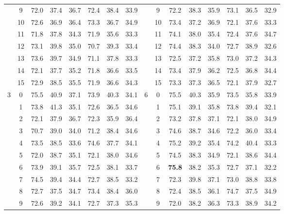 \begin{table}[p]
{\begin{tabular}{c c | c c c | c c c || c c | c c c | c c c}
             & 9 & 72.0 & 37.4 & 36.7 & 72.4 & 38.4 & 33.9 &  & 9 & 72.2 & 38.3 & 35.9 & 73.1 & 36.5 & 32.9 \\
             & 10 & 72.6 & 36.9 & 36.4 & 73.3 & 36.7 & 34.9 &  & 10 & 73.4 & 37.2 & 36.9 & 72.1 & 37.6 & 33.3 \\
             & 11 & 71.8 & 37.8 & 34.3 & 71.9 & 35.6 & 33.3 &  & 11 & 74.1 & 38.0 & 35.4 & 72.4 & 37.6 & 34.7 \\
             & 12 & 73.1 & 39.8 & 35.0 & 70.7 & 39.3 & 33.4 &  & 12 & 74.4 & 38.3 & 34.0 & 72.7 & 38.9 & 32.6 \\
             & 13 & 73.6 & 39.7 & 34.9 & 71.1 & 37.8 & 33.3 &  & 13 & 72.5 & 37.2 & 35.8 & 73.0 & 37.2 & 34.3 \\
             & 14 & 72.1 & 37.7 & 35.2 & 71.8 & 36.6 & 33.5 &  & 14 & 73.4 & 37.9 & 36.2 & 72.5 & 36.8 & 34.4 \\
             & 15 & 72.9 & 38.5 & 35.5 & 71.9 & 36.6 & 34.3 &  & 15 & 73.3 & 37.3 & 36.5 & 72.1 & 37.9 & 32.7 \\
            \midrule
            \multirow{16}{*}{3} & 0 & 75.5 & 40.9 & 37.1 & 73.9 & 40.3 & 34.1 & \multirow{16}{*}{6} & 0 & 75.5 & 40.3 & 35.9 & 73.5 & 35.8 & 33.9 \\
             & 1 & 73.8 & 41.3 & 35.1 & 72.6 & 36.5 & 34.6 &  & 1 & 75.1 & 39.1 & 35.8 & 73.8 & 39.4 & 32.1 \\
             & 2 & 72.1 & 37.9 & 36.7 & 72.3 & 35.9 & 36.4 &  & 2 & 73.2 & 37.8 & 37.1 & 72.1 & 38.0 & 34.9 \\
             & 3 & 70.7 & 39.0 & 34.0 & 71.2 & 38.4 & 34.6 &  & 3 & 74.6 & 38.7 & 34.6 & 72.2 & 36.0 & 33.4 \\
             & 4 & 73.5 & 38.5 & 33.6 & 74.6 & 37.7 & 34.1 &  & 4 & 75.2 & 39.2 & 35.4 & 74.2 & 40.4 & 33.3 \\
             & 5 & 72.0 & 38.7 & 35.1 & 72.1 & 38.0 & 34.6 &  & 5 & 74.5 & 38.3 & 34.9 & 72.1 & 38.6 & 34.4 \\
             & 6 & 73.9 & 39.1 & 35.7 & 72.5 & 38.1 & 33.7 &  & 6 & \textbf{75.8} & 38.2 & 35.3 & 72.7 & 37.1 & 32.2 \\
             & 7 & 74.5 & 39.4 & 34.4 & 72.7 & 38.5 & 33.2 &  & 7 & 72.3 & 39.8 & 37.1 & 73.0 & 38.8 & 33.8 \\
             & 8 & 72.7 & 37.5 & 34.7 & 73.4 & 38.4 & 36.0 &  & 8 & 72.4 & 38.5 & 36.1 & 74.7 & 37.5 & 34.9 \\
             & 9 & 72.6 & 39.2 & 34.1 & 72.7 & 37.3 & 35.3 &  & 9 & 72.0 & 38.2 & 36.3 & 73.3 & 38.9 & 34.2 \\

\end{tabular}}
\end{table}
